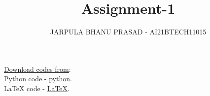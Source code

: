 \documentclass[journal,12pt,twocolumn]{IEEEtran}
\renewcommand\thesection{\arabic{section}}
\begin{document}
\let\StandardTheFigure\thefigure
\renewcommand{\thefigure}{\thesection}



\makeatletter
{}
\makeatother

\let\StandardTheFigure\thefigure
\let\StandardTheTable\thetable
\let\vec\mathbf
{}

\vspace{3cm}


\title{%
	Assignment-1
}

%
%
%

\author{JARPULA BHANU PRASAD - AI21BTECH11015}
\maketitle

    \underline{Download codes from}:\\
    Python code  - \href{https://github.com/jarpula-Bhanu/EE3900/blob/main/Assignment-1/code/inverse.py}{python}.\\
    LaTeX  code - \href{https://github.com/jarpula-Bhanu/EE3900/blob/main/Assignment-1/Assignment-1.tex}{\LaTeX}.


\tableofcontents

\bigskip

\renewcommand{\thefigure}{\theenumi}
\renewcommand{\thetable}{\theenumi}
\end{document}
